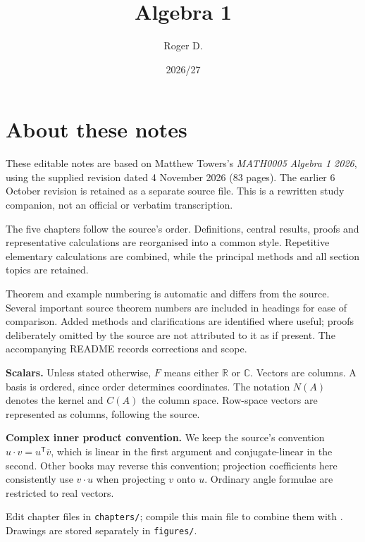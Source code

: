 \documentclass[11pt,a4paper,oneside]{report}
\title{Algebra 1\\[0.4em]\large}
\author{Roger D.}
\date{2026/27}
\theoremstyle{definition}
\theoremstyle{remark}
\numberwithin{equation}{chapter}
\begin{document}
\maketitle
{}
\chapter*{About these notes}
These editable notes are based on Matthew Towers's \emph{MATH0005 Algebra 1
2026}, using the supplied revision dated 4 November 2026 (83 pages).
The earlier 6 October revision is retained as a separate source file.
This is a rewritten study companion, not an official or verbatim transcription.

The five chapters follow the source's order. Definitions, central results,
proofs and representative calculations are reorganised into a common style.
Repetitive elementary calculations are combined, while the principal methods
and all section topics are retained.

Theorem and example numbering is automatic and differs from the source.
Several important source theorem numbers are included in headings for ease
of comparison. Added methods and clarifications are identified where useful;
proofs deliberately omitted by the source are not attributed to it as if
present. The accompanying README records corrections and scope.

\textbf{Scalars.} Unless stated otherwise, $F$ means either $\mathbb R$ or
$\mathbb C$. Vectors are columns. A basis is ordered, since order determines
coordinates. The notation $N(A)$ denotes the kernel and $C(A)$ the column
space. Row-space vectors are represented as columns, following the source.

\textbf{Complex inner product convention.} We keep the source's convention
$u\cdot v=u^{\mathsf T}\overline v$, which is linear in the first argument
and conjugate-linear in the second. Other books may reverse this convention;
projection coefficients here consistently use $v\cdot u$ when projecting
$v$ onto $u$. Ordinary angle formulae are restricted to real vectors.

Edit chapter files in \texttt{chapters/}; compile this main file to combine
them with \verb||. Drawings are stored separately in \texttt{figures/}.
\tableofcontents
\clearpage
{}





\end{document}

